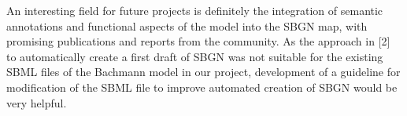 An interesting field for future projects is definitely the integration of semantic annotations and functional aspects of the model into the SBGN map, with promising publications and reports from the community. As the approach in [2] to automatically create a first draft of SBGN was not suitable for the existing SBML files of the Bachmann model in our project, development of a guideline for modification of the SBML file to improve automated creation of SBGN would be very helpful.
